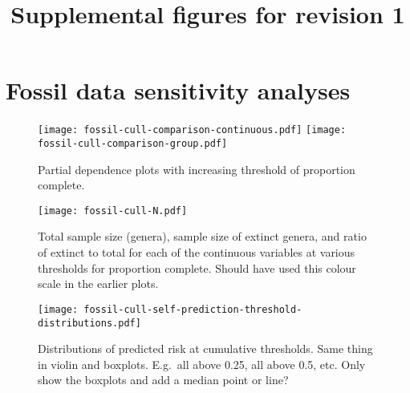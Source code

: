 \documentclass[11pt]{article}
\title{Supplemental figures for revision 1}
\author{}
\begin{document}
\maketitle

\section{Fossil data sensitivity analyses}

\begin{figure}[htbp]
\begin{center}
\texttt{[image: fossil-cull-comparison-continuous.pdf]}
\texttt{[image: fossil-cull-comparison-group.pdf]}
\caption{Partial dependence plots with increasing threshold of proportion complete.}
\label{fig:partial-paleo-culls}
\end{center}
\end{figure}

\clearpage

\begin{figure}[htbp]
\begin{center}
\texttt{[image: fossil-cull-N.pdf]}
\caption{Total sample size (genera), sample size of extinct genera, and ratio of extinct to total for each of the continuous variables at various thresholds for proportion complete. Should have used this colour scale in the earlier plots.}
\label{fig:raw-predictor-paleo-culls}
\end{center}
\end{figure}

\clearpage



\begin{figure}[htbp]
\begin{center}
\texttt{[image: fossil-cull-self-prediction-threshold-distributions.pdf]}
\caption{Distributions of predicted risk at cumulative thresholds. Same thing in violin and boxplots. E.g.\ all above 0.25, all above 0.5, etc. Only show the boxplots and add a median point or line?}
\label{fig:ext-boxplots-paleo-culls}
\end{center}
\end{figure}
\end{document}
